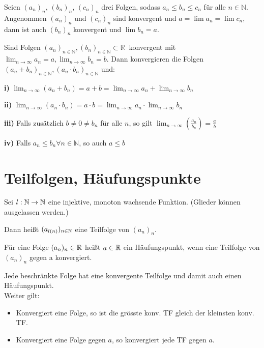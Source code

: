 \begin{theorem}
	Seien $(a_n)_n$, $(b_n)_n$, $(c_n)_n$ drei Folgen, sodass $a_n \leq b_n \leq c_n$ für alle $n \in \mathbb{N}$.
    Angenommen $(a_n)_n$ und $(c_n)_n$ sind konvergent und $a = \lim a_n = \lim c_n$, dann ist auch $(b_n)_n$ konvergent und $\lim b_n = a$.
\end{theorem}
    
	\begin{theorem}
    Sind Folgen $(a_n)_{n\in \mathbb{N}},(b_n)_{n\in \mathbb{N}} \subset \mathbb{R}\ $ konvergent mit $\lim_{n \to \infty} a_n= a, \lim_{n \to \infty}b_n = b$.
    Dann konvergieren die Folgen $(a_n+b_n)_{n\in \mathbb{N}}, (a_n\cdot b_n)_{n \in \mathbb{N}}$ und:
	
	\textbf{i)} $\lim_{n \to \infty} (a_n+b_n)= a+b = \lim_{n \to \infty}a_n+\lim_{n \to \infty}b_n$
	
	\textbf{ii)} $\lim_{n \to \infty} (a_n\cdot b_n)= a\cdot b = \lim_{n \to \infty}a_n\cdot\lim_{n \to \infty}b_n$
	
	\textbf{iii)} Falls zusätzlich $b\neq 0 \neq b_n$ für alle $n$, so gilt $\lim_{n \to \infty}(\frac{a_n}{b_n})= \frac{a}{b}$
	
	
	\textbf{iv)} Falls $a_n \leq b_n \forall n\in \mathbb{N}$, so auch $a\leq b$
	
	\end{theorem}

\section{Teilfolgen, Häufungspunkte}
\begin{definition}[Teilfolge]
Sei $l:\mathbb{N} \rightarrow \mathbb{N}$ eine injektive, monoton wachsende Funktion. (Glieder können ausgelassen werden.)

Dann heißt $(a_{l(n)})_{n\in \mathbb{N}}$ eine Teilfolge von $(a_n)_n$.
\end{definition}

\begin{definition}[Häufiungspunkt]
Für eine Folge $(a_n)_n\in\mathbb{R}$ heißt $a\in\mathbb{R}$ ein Häufungspunkt, wenn eine Teilfolge von $(a_n)_n$ gegen a konvergiert.
\end{definition}

\begin{theorem}
Jede beschränkte Folge hat eine konvergente Teilfolge und damit auch einen Häufungspunkt.
\\
Weiter gilt:
\begin{itemize}
\item Konvergiert eine Folge, so ist die grösste konv. TF gleich der kleinsten konv. TF.
\item Konvergiert eine Folge gegen $a$, so konvergiert jede TF gegen $a$.
\end{itemize}

\end{theorem}

